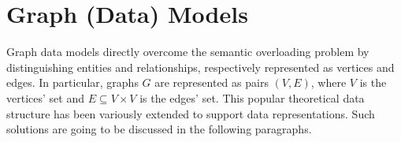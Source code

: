 
\section{Graph (Data) Models}\label{sec:datamodelglit}
Graph data models directly overcome the semantic overloading problem by distinguishing entities and relationships, respectively represented as vertices and edges. In particular, graphs $G$ are represented as pairs $(V,E)$, where $V$ is the vertices' set and $E\subseteq V\times V$ is the edges' set. This popular theoretical data structure has been variously extended to support data representations. Such solutions are going to be discussed in the following paragraphs.










